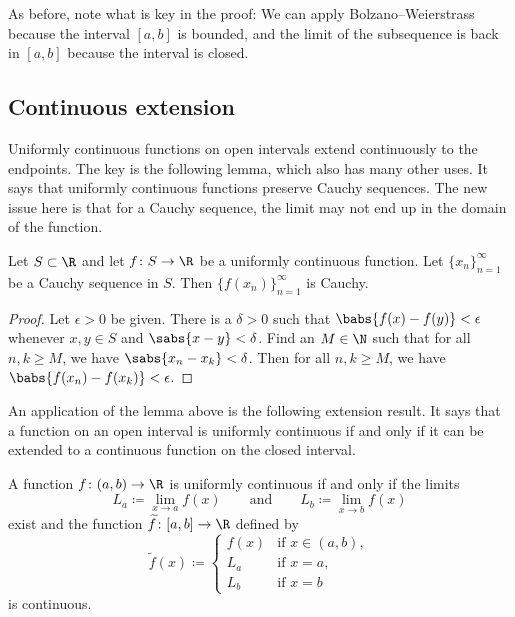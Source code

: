As before, note what is key in the proof: We can apply Bolzano--Weierstrass
because the interval $[a,b]$ is bounded, and the limit of the subsequence is
back in $[a,b]$ because the interval is closed.

\subsection{Continuous extension}

Uniformly continuous functions on open intervals extend continuously
to the endpoints.
The key is the following lemma, which also has many other uses.
It says that uniformly continuous functions preserve Cauchy sequences.
The new issue here is that for a Cauchy sequence,
the limit may not end up in the domain of the function.

\begin{lemma} \label{unifcauchycauchy:lemma}
Let $S \subset \R$ and let $f \colon S \to \R$ be a uniformly continuous function.  Let
$\{ x_n \}_{n=1}^\infty$ be a Cauchy sequence in $S$.
Then $\bigl\{ f(x_n) \bigr\}_{n=1}^\infty$ is Cauchy.
\end{lemma}

\begin{proof}
Let $\epsilon > 0$ be given.  There is a $\delta > 0$ such that
$\babs{f(x)-f(y)} < \epsilon$ whenever $x,y \in S$ and $\sabs{x-y} < \delta$.  Find an $M
\in \N$ such that for all $n, k \geq M$, we have $\sabs{x_n-x_k} < \delta$.
Then for all $n, k \geq M$, we have $\babs{f(x_n)-f(x_k)} < \epsilon$.
\end{proof}

An application of the lemma above is the following extension result.  It says that
a function on an open interval is uniformly continuous if and only if
it can be extended to a continuous function on the closed interval.

\begin{prop} \label{context:prop}
A function $f \colon (a,b) \to \R$ is uniformly continuous if and only if
the limits 
\begin{equation*}
L_a \coloneqq \lim_{x \to a} f(x) \qquad \text{and} \qquad
L_b \coloneqq \lim_{x \to b} f(x)
\end{equation*}
exist and the function $\widetilde{f} \colon [a,b] \to \R$
defined by
\begin{equation*}
\widetilde{f}(x) \coloneqq
\begin{cases}
f(x) & \text{if } x \in (a,b), \\
L_a & \text{if } x = a, \\
L_b & \text{if } x = b
\end{cases}
\end{equation*}
is continuous.
\end{prop}

